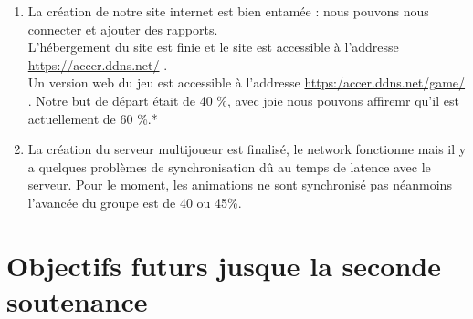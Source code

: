\documentclass[titlepage, 13px, a4paper]{article}
\begin{document}
{\begin{enumerate}
		Le joueur possède une script lui permettant d'avoir une vie, de prendre des dégats et d'attaquer un Game Object.
		Mais vous n'avons pas encore mis en place ce système.
		Nous avions prévu de faire 50 \% de la tache et il a été fait plus que notre objectif de départ.
		\\ \newpage	
	\item La création de notre site internet est bien entamée : nous pouvons nous connecter et ajouter des rapports. \\
		L'hébergement du site est finie et le site est accessible à l'addresse \url{https://accer.ddns.net/} .  \\
		Un version web du jeu est accessible à l'addresse \url{https:/accer.ddns.net/game/} .
		Notre but de départ était de 40 \%, avec joie nous pouvons affiremr qu'il est actuellement de 60 \%.*
		\\
	\item La création du serveur multijoueur est finalisé, le network fonctionne mais il y a quelques problèmes de synchronisation dû au temps de latence avec le serveur.
		Pour le moment, les animations ne sont synchronisé pas néanmoins l'avancée du groupe est de 40 ou 45\%.
		\\
\end{enumerate}}

\section{Objectifs futurs jusque la seconde soutenance} 
\end{document}
